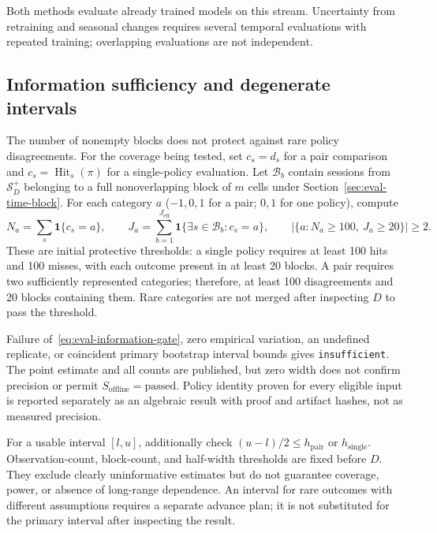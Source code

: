 \documentclass[12pt,a4paper]{article}
\newcommand{\code}[1]{{\ttfamily\small\nolinkurl{#1}}}
\newcommand{\ind}{\mathbf 1}
\theoremstyle{plainru}
\begin{document}
Both methods evaluate already trained models on this stream.
Uncertainty from retraining and seasonal changes requires several
temporal evaluations with repeated training; overlapping evaluations
are not independent.

\subsection{Information sufficiency and degenerate intervals}
\label{sec:eval-information}

The number of nonempty blocks does not protect against rare policy disagreements.
For the coverage being tested, set $c_s=d_s$ for a pair comparison and
$c_s=\operatorname{Hit}_s(\pi)$ for a single-policy evaluation.
Let $\mathcal B_b$ contain sessions from $\mathcal S_D^+$ belonging to a full
nonoverlapping block of $m$ cells under Section~\ref{sec:eval-time-block}.
For each category $a$ ($-1,0,1$ for a pair; $0,1$ for one policy),
compute
\begin{equation}\label{eq:eval-information-gate}
N_a=\sum_s\ind\{c_s=a\},\qquad
J_a=\sum_{b=1}^{J_{\mathrm{eff}}}
 \ind\{\exists s\in\mathcal B_b:c_s=a\},\qquad
\left|\{a:N_a\ge100,\ J_a\ge20\}\right|\ge2.
\end{equation}
These are initial protective thresholds: a single policy requires at least
100 hits and 100 misses, with each outcome present in at least 20 blocks.
A pair requires two sufficiently represented categories; therefore,
at least 100 disagreements and 20 blocks containing them. Rare categories
are not merged after inspecting $D$ to pass the threshold.

Failure of~\eqref{eq:eval-information-gate}, zero empirical variation,
an undefined replicate, or coincident primary bootstrap interval bounds
gives \code{insufficient}. The point estimate and all counts are published,
but zero width does not confirm precision or permit
$S_{\mathrm{offline}}=\mathrm{passed}$. Policy identity proven for every eligible input
is reported separately as an algebraic result
with proof and artifact hashes, not as measured precision.

For a usable interval $[l,u]$, additionally check
$(u-l)/2\le h_{\mathrm{pair}}$ or $h_{\mathrm{single}}$.
Observation-count, block-count, and half-width thresholds are fixed before $D$.
They exclude clearly uninformative estimates but do not guarantee coverage,
power, or absence of long-range dependence. An interval for rare
outcomes with different assumptions requires a separate advance plan;
it is not substituted for the primary interval after inspecting the result.
\end{document}
